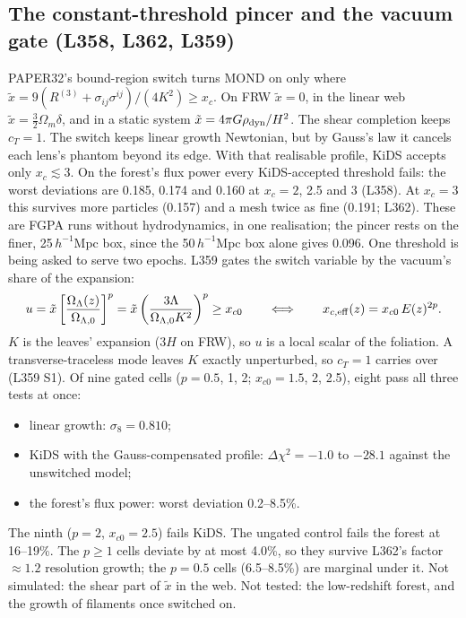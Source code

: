 \documentclass[10pt]{article}
\begin{document}
\subsection{The constant-threshold pincer and the vacuum gate (L358, L362, L359)}
PAPER32's bound-region switch turns MOND on only where $\tilde x=9(R^{(3)}+\sigma_{ij}\sigma^{ij})/(4K^2)\geq x_c$. On FRW $\tilde x=0$, in the linear web $\tilde x=\tfrac32\Omega_m\delta$, and in a static system $\tilde x=4\pi G\rho_{\rm dyn}/H^2$. The shear completion keeps $c_T=1$. The switch keeps linear growth Newtonian, but by Gauss's law it cancels each lens's phantom beyond its edge. With that realisable profile, KiDS accepts only $x_c\lesssim3$.
On the forest's flux power every KiDS-accepted threshold fails: the worst deviations are 0.185, 0.174 and 0.160 at $x_c=2$, 2.5 and 3 (L358). At $x_c=3$ this survives more particles (0.157) and a mesh twice as fine (0.191; L362). These are FGPA runs without hydrodynamics, in one realisation; the pincer rests on the finer, 25\,$h^{-1}$Mpc box, since the 50\,$h^{-1}$Mpc box alone gives 0.096. One threshold is being asked to serve two epochs.
L359 gates the switch variable by the vacuum's share of the expansion:
\begin{equation}
u=\tilde x\left[\frac{\Omega_\Lambda(z)}{\Omega_{\Lambda,0}}\right]^p=\tilde x\left(\frac{3\Lambda}{\Omega_{\Lambda,0}K^2}\right)^p\geq x_{c0}\qquad\Longleftrightarrow\qquad x_{c,{\rm eff}}(z)=x_{c0}\,E(z)^{2p}.
\end{equation}
$K$ is the leaves' expansion ($3H$ on FRW), so $u$ is a local scalar of the foliation. A transverse-traceless mode leaves $K$ exactly unperturbed, so $c_T=1$ carries over (L359 S1).
Of nine gated cells ($p=0.5$, 1, 2; $x_{c0}=1.5$, 2, 2.5), eight pass all three tests at once:
\begin{itemize}
\item linear growth: $\sigma_8=0.810$;
\item KiDS with the Gauss-compensated profile: $\Delta\chi^2=-1.0$ to $-28.1$ against the unswitched model;
\item the forest's flux power: worst deviation 0.2--8.5\%.
\end{itemize}
The ninth ($p=2$, $x_{c0}=2.5$) fails KiDS. The ungated control fails the forest at 16--19\%. The $p\geq1$ cells deviate by at most 4.0\%, so they survive L362's factor $\approx1.2$ resolution growth; the $p=0.5$ cells (6.5--8.5\%) are marginal under it. Not simulated: the shear part of $\tilde x$ in the web. Not tested: the low-redshift forest, and the growth of filaments once switched on.
\end{document}
